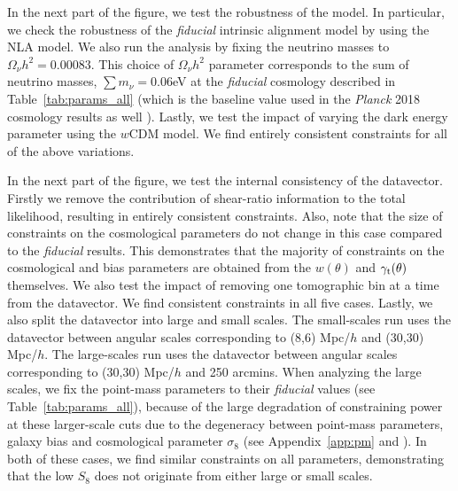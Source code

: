 \documentclass[aps, prd,twocolumn,superscriptaddress,nofootinbib,preprintnumbers]{revtex4-1}
\newcommand{\gammat}{\ensuremath{\gamma_{\rm t}(\theta)}}
\newcommand{\wtheta}{\ensuremath{w(\theta)}}
\begin{document}
In the next part of the figure, we test the robustness of the model. In particular, we check the robustness of the \textit{fiducial} intrinsic alignment model by using the NLA model. We also run the analysis by fixing the neutrino masses to $\Omega_{\nu}h^2 = 0.00083$. This choice of $\Omega_{\nu}h^2$ parameter corresponds to the sum of neutrino masses, $\sum m_{\nu}=0.06$eV at the \textit{fiducial} cosmology described in Table~\ref{tab:params_all} (which is the baseline value used in the \textit{Planck} 2018 cosmology results as well \citep{Planck_2018_cosmo}). Lastly, we test the impact of varying the dark energy parameter using the $w$CDM model. We find entirely consistent constraints for all of the above variations. 

In the next part of the figure, we test the internal consistency of the datavector. Firstly we remove the contribution of shear-ratio information to the total likelihood, resulting in entirely consistent constraints. Also, note that the size of constraints on the cosmological parameters do not change in this case compared to the \textit{fiducial} results. This demonstrates that the majority of constraints on the cosmological and bias parameters are obtained from the $\wtheta$ and $\gammat$ themselves. We also test the impact of removing one tomographic bin at a time from the datavector. We find consistent constraints in all five cases. %
Lastly, we also split the datavector into large and small scales. The small-scales run uses the datavector between  angular scales corresponding to (8,6) Mpc/$h$ and (30,30) Mpc/$h$. The large-scales run uses the datavector between angular scales corresponding to (30,30) Mpc/$h$ and 250 arcmins. When analyzing the large scales, we fix the point-mass parameters to their \textit{fiducial} values (see Table~\ref{tab:params_all}), because of the large degradation of constraining power at these larger-scale cuts due to the degeneracy between point-mass parameters, galaxy bias and cosmological parameter $\sigma_8$ (see Appendix~\ref{app:pm} and \citet{MacCrann:2019ntb}). In both of these cases, we find similar constraints on all parameters, demonstrating that the low $S_8$ does not originate from either large or small scales.
\end{document}
